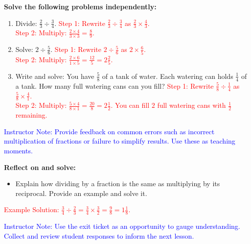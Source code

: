 \documentclass[12pt]{article}
\begin{document}
\begin{tcolorbox}[colframe=black!60, colback=white, 
coltitle=black, colbacktitle=black!15, fonttitle=\bfseries\Large, 
title=Independent Practice, halign title=center, left=10pt, right=10pt, top=10pt, bottom=15pt]
\textbf{Solve the following problems independently:}
\begin{enumerate}[itemsep=3em]
    \item Divide: \( \frac{2}{3} \div \frac{3}{4} \).
    \textcolor{red}{
    Step 1: Rewrite \( \frac{2}{3} \div \frac{3}{4} \) as \( \frac{2}{3} \times \frac{4}{3} \).\\
    Step 2: Multiply: \( \frac{2 \times 4}{3 \times 3} = \frac{8}{9} \).}

    \item Solve: \( 2 \div \frac{5}{6} \).
    \textcolor{red}{
    Step 1: Rewrite \( 2 \div \frac{5}{6} \) as \( 2 \times \frac{6}{5} \).\\
    Step 2: Multiply: \( \frac{2 \times 6}{1 \times 5} = \frac{12}{5} = 2 \frac{2}{5} \).}

    \item Write and solve: You have \( \frac{5}{8} \) of a tank of water. Each watering can holds \( \frac{1}{4} \) of a tank. How many full watering cans can you fill?
    \textcolor{red}{
    Step 1: Rewrite \( \frac{5}{8} \div \frac{1}{4} \) as \( \frac{5}{8} \times \frac{4}{1} \).\\
    Step 2: Multiply: \( \frac{5 \times 4}{8 \times 1} = \frac{20}{8} = 2 \frac{1}{2} \). You can fill \( 2 \) full watering cans with \( \frac{1}{2} \) remaining.}
\end{enumerate}
\textcolor{blue}{Instructor Note: Provide feedback on common errors such as incorrect multiplication of fractions or failure to simplify results. Use these as teaching moments.}
\end{tcolorbox}

\vspace{1em}

\begin{tcolorbox}[colframe=black!60, colback=white, 
coltitle=black, colbacktitle=black!15, fonttitle=\bfseries\Large, 
title=Exit Ticket, halign title=center, left=10pt, right=10pt, top=10pt, bottom=15pt]
\textbf{Reflect on and solve:}
\begin{itemize}
    \item Explain how dividing by a fraction is the same as multiplying by its reciprocal. Provide an example and solve it. 
\end{itemize}
\textcolor{red}{
Example Solution: \( \frac{3}{4} \div \frac{2}{3} = \frac{3}{4} \times \frac{3}{2} = \frac{9}{8} = 1 \frac{1}{8} \).}

\textcolor{blue}{Instructor Note: Use the exit ticket as an opportunity to gauge understanding. Collect and review student responses to inform the next lesson.}
\end{tcolorbox}
\end{document}
